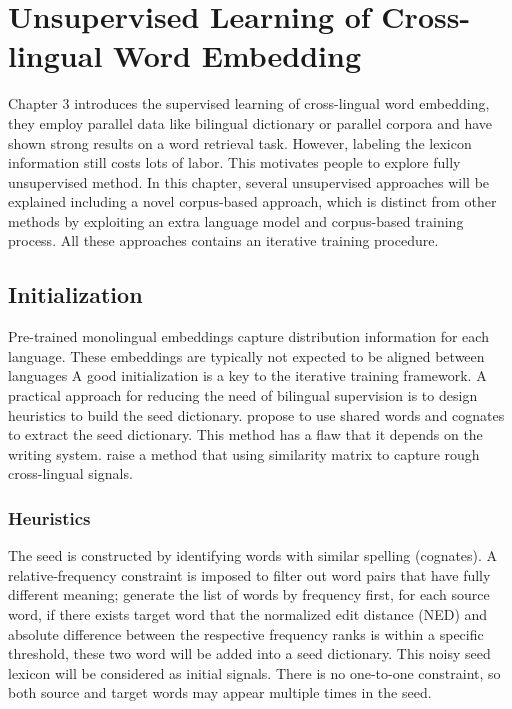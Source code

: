 \chapter{Unsupervised Learning of Cross-lingual Word Embedding}
Chapter 3 introduces the supervised learning of cross-lingual word embedding, they employ parallel data like bilingual dictionary or parallel corpora and have shown strong results on a word retrieval task.  However, labeling the lexicon information still costs lots of labor. This motivates people to explore fully unsupervised method. In this chapter, several unsupervised approaches will be explained including a novel corpus-based approach, which is distinct from other methods by exploiting an extra language model and corpus-based training process. All these approaches contains an iterative training procedure. 
\section{Initialization}
Pre-trained monolingual embeddings capture distribution information for each language. These embeddings are typically not expected to be aligned between languages A good initialization is a key to the iterative training framework.
A practical approach for reducing the need of bilingual supervision is to design heuristics to build the seed dictionary. \cite{hauer2017bootstrapping} propose to use shared words and cognates to extract the seed dictionary. This method has a flaw that it depends on the writing system. \cite{artetxe2018robust} raise a method that using similarity matrix to capture rough cross-lingual signals.\\

\subsection{Heuristics}
The seed is constructed by identifying words with similar spelling (cognates). A relative-frequency constraint is imposed to filter out word pairs that have fully different meaning; generate the list of words by frequency first, for each source word, if there exists target word that the normalized edit distance (NED) and absolute difference between the respective frequency ranks is within a specific threshold, these two word will be added into a seed dictionary.  This noisy seed lexicon will be considered as initial signals. There is no one-to-one constraint, so both source and target words may appear multiple times in the seed. 

